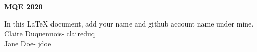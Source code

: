 \documentclass[a4paper, 10pt]{article}
\begin{document}
\begin{center}\bfseries\Huge MQE 2020 \end{center}

\vspace{10mm} %
In this LaTeX document, add your name and github account name under mine.\\

\vspace{10mm} %
Claire Duquennois- claireduq\\
Jane Doe- jdoe\\
\end{document}
